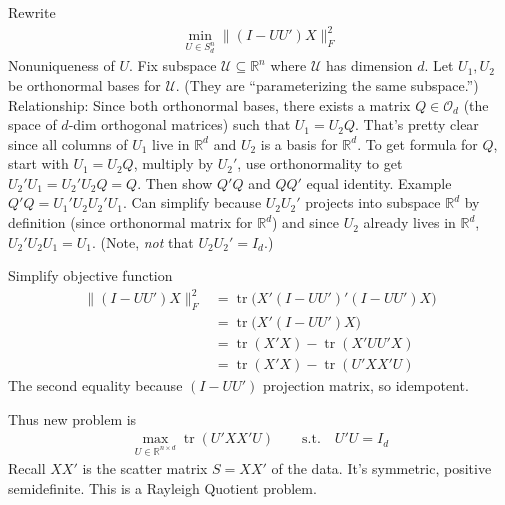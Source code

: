\documentclass[12pt]{article}
\numberwithin{equation}{section} %
\theoremstyle{plain}
\theoremstyle{definition}
\theoremstyle{remark}
\newcommand{\trace}{\operatorname{tr}}
\newcommand{\calO}{\mathcal{O}}
\newcommand{\calU}{\mathcal{U}}
\newcommand{\R}{\mathbb{R}}
\newcommand{\Rn}{\mathbb{R}^n}
\begin{document}
Rewrite
\begin{align*}
  \min_{U\in S_d^n}
  \lVert (I-UU')X\rVert_F^2
\end{align*}
Nonuniqueness of $U$.
Fix subspace $\calU\subseteq \Rn$ where $\calU$ has dimension $d$.
Let $U_1,U_2$ be orthonormal bases for $\calU$.
(They are ``parameterizing the same subspace.'')
Relationship:
Since both orthonormal bases, there exists a matrix $Q\in\calO_d$ (the
space of $d$-dim orthogonal matrices) such that $U_1=U_2Q$.
That's pretty clear since all columns of $U_1$ live in $\R^d$ and $U_2$
is a basis for $\R^d$.
To get formula for $Q$, start with $U_1=U_2Q$, multiply by $U_2'$, use
orthonormality to get $U_2'U_1=U_2'U_2Q=Q$.
Then show $Q'Q$ and $QQ'$ equal identity.
Example $Q'Q=U_1'U_2U_2'U_1$. Can simplify because $U_2U_2'$ projects
into subspace $\R^d$ by definition (since orthonormal matrix for $\R^d$)
and since $U_2$ already lives in $\R^d$, $U_2'U_2U_1=U_1$.
(Note, \emph{not} that $U_2U_2'=I_d$.)

Simplify objective function
\begin{align*}
  \lVert (I-UU')X\rVert_F^2
  &=
  \trace\big(
    X'(I-UU')'
    (I-UU')X
  \big)
  \\
  &=
  \trace\big(
    X' (I-UU')X
  \big)
  \\
  &= \trace(X'X)-\trace(X'UU'X)
  \\
  &= \trace(X'X)-\trace(U'XX'U)
\end{align*}
The second equality because $(I-UU')$ projection matrix, so idempotent.

Thus new problem is
\begin{align*}
  \max_{U\in\R^{n\times d}}
  \trace(U'XX'U)
  \qquad\text{s.t.}\quad
  U'U=I_d
\end{align*}
Recall $XX'$ is the scatter matrix $S=XX'$ of the data.
It's symmetric, positive semidefinite.
This is a Rayleigh Quotient problem.
\end{document}

